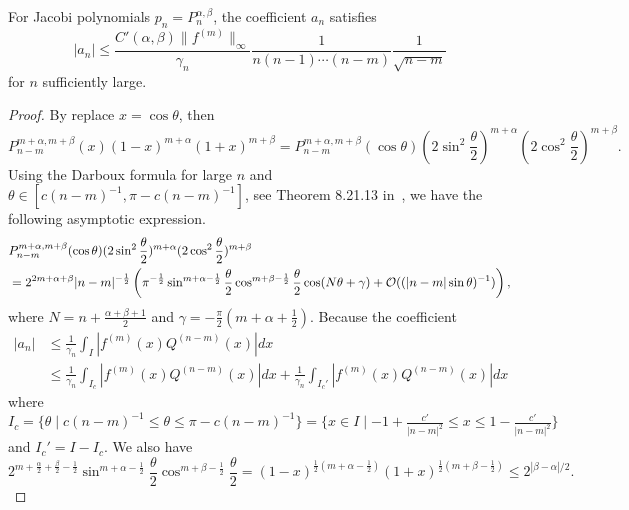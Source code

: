 \begin{theorem}
    For Jacobi polynomials $p_n = P_n^{\alpha, \beta}$, the coefficient $a_n$ satisfies 
    \begin{equation}
        |a_n| \le \frac{C'(\alpha, \beta)\|f^{(m)}\|_{\infty}}{\gamma_n}  \frac{1}{n(n-1)\cdots (n-m)} \frac{1}{\sqrt{n-m}}
    \end{equation}
    for $n$ sufficiently large.
\end{theorem}
\begin{proof}
By replace $x = \cos\theta$, then 
\begin{equation}\nonumber
    P_{n-m}^{m+\alpha, m+\beta}(x) (1-x)^{m+\alpha}(1+x)^{m+\beta} = P_{n-m}^{m+\alpha, m+\beta}(\cos\theta) \left(2\sin^2 \frac{\theta}{2}\right)^{m+\alpha}\left(2\cos^2\frac{\theta}{2}\right)^{m+\beta}.
\end{equation}
Using the Darboux formula for large $n$ and $\theta\in [c (n-m)^{-1}, \pi - c(n-m)^{-1}]$, see Theorem 8.21.13 in~\cite{szeg1939orthogonal}, we have the following asymptotic expression.  
\begin{equation}\nonumber
\begin{aligned}
&P_{n-m}^{m+\alpha, m+\beta}(\cos\theta) (2\sin^2 \frac{\theta}{2})^{m+\alpha}(2\cos^2\frac{\theta}{2})^{m+\beta}\\
&=    2^{2m+\alpha+\beta}|n-m|^{-\frac{1}{2}}\left( \pi^{-\frac{1}{2}}\sin^{m+\alpha-\frac{1}{2}}\frac{\theta}{2} \cos^{m+\beta-\frac{1}{2}}\frac{\theta}{2} \cos(N\theta+\gamma) + \mathcal O((|n-m|\sin\theta)^{-1})\right), 
\end{aligned}
\end{equation}
where $N = n + \frac{\alpha+\beta+1}{2}$ and $\gamma = -\frac{\pi}{2}(m + \alpha + \frac{1}{2})$. 
    Because the coefficient 
    \begin{equation}
    \begin{aligned}
        |a_n| &\le \frac{1}{\gamma_n} \int_{I} |f^{(m)}(x) Q^{(n-m)}(x) | dx  \\
        &\le \frac{1}{\gamma_n} \int_{I_c} |f^{(m)}(x) Q^{(n-m)}(x) | dx + \frac{1}{\gamma_n} \int_{I_c'} |f^{(m)}(x)Q^{(n-m)}(x)| dx 
    \end{aligned}
    \end{equation}
    where $I_c = \{\theta\mid c (n-m)^{-1}\le \theta\le \pi - c(n-m)^{-1} \} = \{x\in I\mid -1+\frac{c'}{|n-m|^2} \le x \le 1 - \frac{c'}{|n-m|^2}\}$ and $I_c' = I - I_c$. We also have
    \begin{equation}
    \label{EQ: 4-BOU-JAC}
        2^{m+\frac{\alpha}{2} + \frac{\beta}{2} - \frac{1}{2}} \sin^{m+\alpha-\frac{1}{2}}\frac{\theta}{2} \cos^{m+\beta-\frac{1}{2}}\frac{\theta}{2}  = (1-x)^{\frac{1}{2}(m+\alpha-\frac{1}{2})} (1+x)^{\frac{1}{2}(m+\beta-\frac{1}{2})} \le 2^{|\beta-\alpha|/2}.

\end{equation}
\end{proof}
